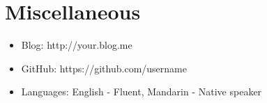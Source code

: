 \documentclass{resume}
\begin{document}


\section{\texorpdfstring{\faInfo}\ Miscellaneous}
\begin{itemize}[parsep=0.5ex]
  \item Blog: http://your.blog.me
  \item GitHub: https://github.com/username
  \item Languages: English - Fluent, Mandarin - Native speaker
\end{itemize}

%
%
\end{document}
